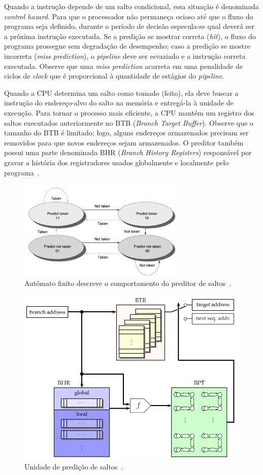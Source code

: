 \documentclass{SBCbookchapter}
\begin{document}
Quando a instru\c{c}\~{a}o depende de um salto condicional, essa situa\c{c}\~{a}o \'{e} denominada \textit{control hazard}. Para que o processador n\~{a}o permane\c{c}a ocioso at\'{e} que o fluxo do programa seja definido, durante o per\'{i}odo de decis\~{a}o especula-se qual dever\'{a} ser a pr\'{o}xima instru\c{c}\~{a}o executada. Se a predi\c{c}\~{a}o se mostrar correta (\textit{hit}), o fluxo do programa prossegue sem degrada\c{c}\~{a}o de desempenho; caso a predi\c{c}\~{a}o se mostre incorreta (\textit{miss prediction}), o \textit{pipeline} deve ser esvaziado e a instru\c{c}\~{a}o correta executada. Observe que uma \textit{miss prediction} acarreta em uma penalidade de ciclos de \textit{clock} que \'{e} proporcional \`{a} quantidade de est\'{a}gios do \textit{pipeline}.

Quando a CPU determina um salto como tomado (feito), ela deve buscar a instru\c{c}\~{a}o do endere\c{c}o-alvo do salto na mem\'{o}ria e entreg\'{a}-la à unidade de execu\c{c}\~{a}o. Para tornar o processo mais eficiente, a CPU mant\'{e}m um registro dos saltos executados anteriormente no BTB (\textit{Branch Target Buffer}). Observe que o tamanho do BTB \'{e} limitado; logo, alguns endere\c{c}os armazenados precisam ser removidos para que novos endere\c{c}os sejam armazenados.
O preditor tamb\'{e}m possui uma parte denominada BHR (\textit{Branch History Registers}) respons\'{a}vel por gravar a hist\'{o}ria dos registradores usados globalmente e localmente pelo programa~\cite{Jean-Pierre06predictingsecret}.

\begin{figure}[ht]
	\centering
	\includegraphics[width=0.7\textwidth]{figures/automato.png}
	\caption{Aut\^{o}mato finito descreve o comportamento do preditor de saltos~\cite{493986}.}
	\label{fig:Fig_automato}
\end{figure}

\begin{figure}[ht]
	\centering
	\includegraphics[width=.5\textwidth]{figures/btu.jpg}
	\caption{Unidade de predi\c{c}\~{a}o de saltos~\cite{Jean-Pierre06predictingsecret}.}
	\label{fig:Fig_btu}
\end{figure}
\end{document}
